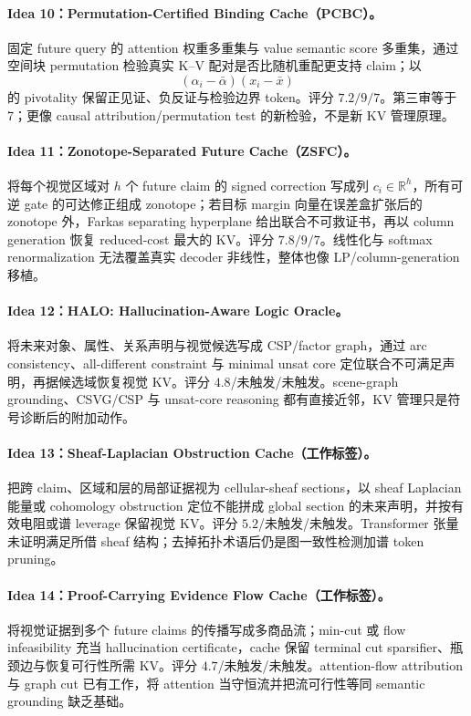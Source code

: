 \documentclass[UTF8,zihao=-4,a4paper]{ctexart}
\begin{document}
\paragraph{Idea 10：Permutation-Certified Binding Cache（PCBC）。}
固定 future query 的 attention 权重多重集与 value semantic score 多重集，通过空间块 permutation 检验真实 K--V 配对是否比随机重配更支持 claim；以
\[
(\alpha_i-\bar\alpha)(x_i-\bar x)
\]
的 pivotality 保留正见证、负反证与检验边界 token。评分 $7.2/9/7$。第三审等于 7；更像 causal attribution/permutation test 的新检验，不是新 KV 管理原理。

\paragraph{Idea 11：Zonotope-Separated Future Cache（ZSFC）。}
将每个视觉区域对 $h$ 个 future claim 的 signed correction 写成列 $c_i\in\mathbb R^h$，所有可逆 gate 的可达修正组成 zonotope；若目标 margin 向量在误差盒扩张后的 zonotope 外，Farkas separating hyperplane 给出联合不可救证书，再以 column generation 恢复 reduced-cost 最大的 KV。评分 $7.8/9/7$。线性化与 softmax renormalization 无法覆盖真实 decoder 非线性，整体也像 LP/column-generation 移植。

\paragraph{Idea 12：HALO: Hallucination-Aware Logic Oracle。}
将未来对象、属性、关系声明与视觉候选写成 CSP/factor graph，通过 arc consistency、all-different constraint 与 minimal unsat core 定位联合不可满足声明，再据候选域恢复视觉 KV。评分 $4.8$/未触发/未触发。scene-graph grounding、CSVG/CSP 与 unsat-core reasoning 都有直接近邻，KV 管理只是符号诊断后的附加动作。

\paragraph{Idea 13：Sheaf-Laplacian Obstruction Cache（工作标签）。}
把跨 claim、区域和层的局部证据视为 cellular-sheaf sections，以 sheaf Laplacian 能量或 cohomology obstruction 定位不能拼成 global section 的未来声明，并按有效电阻或谱 leverage 保留视觉 KV。评分 $5.2$/未触发/未触发。Transformer 张量未证明满足所借 sheaf 结构；去掉拓扑术语后仍是图一致性检测加谱 token pruning。

\paragraph{Idea 14：Proof-Carrying Evidence Flow Cache（工作标签）。}
将视觉证据到多个 future claims 的传播写成多商品流；min-cut 或 flow infeasibility 充当 hallucination certificate，cache 保留 terminal cut sparsifier、瓶颈边与恢复可行性所需 KV。评分 $4.7$/未触发/未触发。attention-flow attribution 与 graph cut 已有工作，将 attention 当守恒流并把流可行性等同 semantic grounding 缺乏基础。
\end{document}
